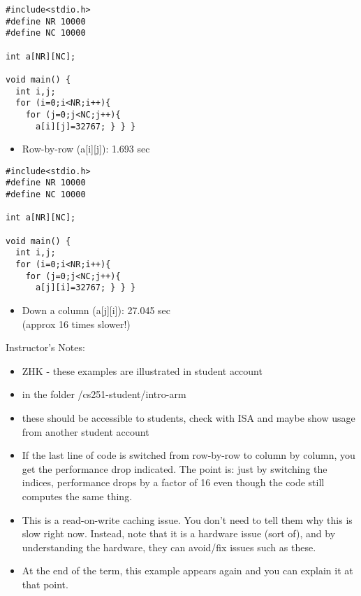 \begin{frame}[fragile]
\begin{multicols}{2}
\begin{verbatim}
#include<stdio.h> 
#define NR 10000 
#define NC 10000 

int a[NR][NC]; 

void main() { 
  int i,j; 
  for (i=0;i<NR;i++){ 
    for (j=0;j<NC;j++){ 
      a[i][j]=32767; } } }
\end{verbatim}

\begin{itemize}
\item Row-by-row (a[i][j]): 1.693 sec 
\end{itemize}

\columnbreak

\begin{verbatim}
#include<stdio.h> 
#define NR 10000 
#define NC 10000 

int a[NR][NC]; 

void main() { 
  int i,j; 
  for (i=0;i<NR;i++){ 
    for (j=0;j<NC;j++){ 
      a[j][i]=32767; } } }
\end{verbatim}
\begin{itemize}
\item Down a column (a[j][i]): 27.045 sec \\
	(approx 16 times slower!)
\end{itemize}
\end{multicols}

\BNotes\ifnum{}

Instructor's Notes:
\begin{itemize}
\item ZHK - these examples are illustrated in student account 
\item in the folder /cs251-student/intro-arm
\item these should be accessible to students, check with ISA and maybe show usage from another student account
\item If the last line of code is switched from row-by-row to column by
	column, you get the performance drop indicated.  The point is:
	just by switching the indices, performance drops by a factor of
	16 even though the code still computes the same thing.

\item This is a read-on-write caching issue.  You don't need to tell them why this is
	slow right now.  Instead, note that it is a hardware issue (sort
	of), and by understanding the hardware, they can avoid/fix issues
	such as these.

\item At the end of the term, this example appears again and you can 
	explain it at that point.
\end{itemize}

\fi\ENotes
\end{frame}

